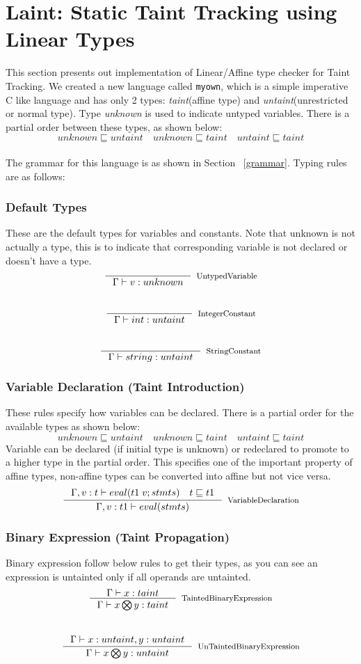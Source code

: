 \documentclass[11pt, pdftex]{article}
\begin{document}
\section{Laint: Static Taint Tracking using Linear Types}
This section presents out implementation of Linear/Affine type checker for Taint Tracking. We created a new language called \texttt{myown}, which is a simple imperative C like language and has only 2 types: \textit{taint}(affine type) and \textit{untaint}(unrestricted or normal type). Type \textit{unknown} is used to indicate untyped variables. There is a partial order between these types, as shown below:\\
$$ unknown \sqsubseteq untaint \quad unknown \sqsubseteq taint \quad untaint \sqsubseteq taint $$ \\
The grammar for this language is as shown in Section ~\ref{grammar}.
Typing rules are as follows:
\subsubsection{Default Types}
These are the default types for variables and constants. Note that unknown is not actually a type, this is to indicate that corresponding variable is not declared or doesn't have a type.
$$ \inference {}{\Gamma \vdash v:unknown}[UntypedVariable]$$
\\
$$ \inference {}{\Gamma \vdash int:untaint}[IntegerConstant]$$
\\
$$ \inference {}{\Gamma \vdash string:untaint}[StringConstant]$$
\subsubsection{Variable Declaration (Taint Introduction)}
These rules specify how variables can be declared. There is a partial order for the available types as shown below:
$$ unknown \sqsubseteq untaint \quad unknown \sqsubseteq taint \quad untaint \sqsubseteq taint $$
Variable can be declared (if initial type is unknown) or redeclared to promote to a higher type in the partial order. This specifies one of the important property of affine types, non-affine types can be converted into affine but not vice versa.
$$ \inference {\Gamma ,v:t \vdash eval(t1 \; v;stmts) \quad t \sqsubseteq t1}{\Gamma , v:t1 \vdash eval(stmts)}[VariableDeclaration]$$
\subsubsection{Binary Expression (Taint Propagation)}
Binary expression follow below rules to get their types, as you can see an expression is untainted only if all operands are untainted.
$$ \inference {\Gamma \vdash x:taint}{\Gamma \vdash x \bigotimes y:taint}[TaintedBinaryExpression]$$
\\
$$ \inference {\Gamma \vdash x:untaint, y:untaint}{\Gamma \vdash x \bigotimes y:untaint}[UnTaintedBinaryExpression]$$
\end{document}
